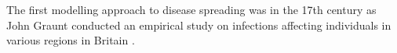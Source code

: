 \documentclass[smallextended]{svjour3}       %
\begin{document}
The first modelling approach to disease spreading was in the 17th century as John Graunt  conducted an empirical study on infections affecting individuals in various regions in Britain \cite{morabia2013epidemiology}.
\end{document}
